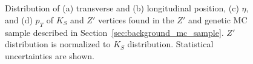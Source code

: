\begin{figure}[!htb]
    \centering
     \\
     \\
    \caption{Distribution of (a) transverse and (b) longitudinal position, (c) $\eta$, and (d) $p_{T}$ of $K_{S}$ and $Z'$ vertices found in the $Z'$ and genetic MC sample described in Section~\ref{sec:background_mc_sample}. $Z'$ distribution is normalized to $K_{S}$ distribution. Statistical uncertainties are shown.}
    \label{fig:Ks_zp_comparison}
\end{figure}

